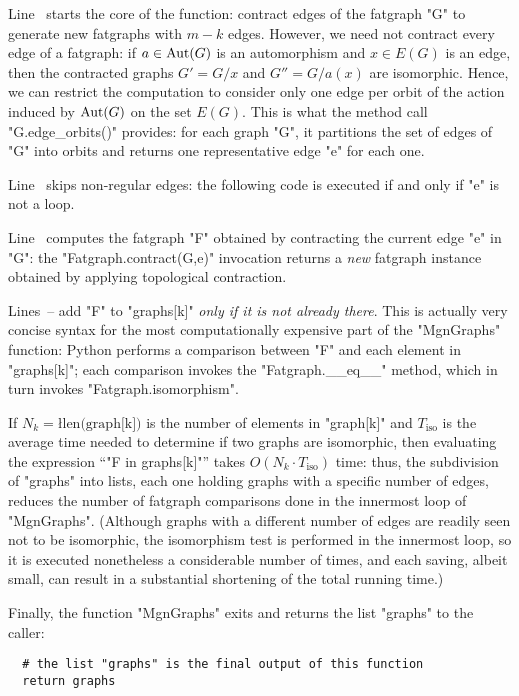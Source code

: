 Line~ starts the core of the function: contract edges
of the fatgraph "G" to generate new fatgraphs with $m-k$ edges.
However, we need not contract every edge of a fatgraph: if $a \in
\operatorname{Aut}(G)$ is an automorphism and $x \in E(G)$ is an edge, then the
contracted graphs $G' = G/x$ and $G'' = G/a(x)$ are isomorphic.
Hence, we can restrict the computation to consider only one edge per
orbit of the action induced by $\operatorname{Aut}(G)$ on the set $E(G)$. This is
what the method call "G.edge_orbits()" provides: for each graph "G",
it partitions the set of edges of "G" into orbits and returns one
representative edge "e" for each one.

Line~ skips non-regular edges: the following code is
executed if and only if "e" is not a loop.

Line~ computes the fatgraph "F" obtained by
contracting the current edge "e" in "G": the "Fatgraph.contract(G,e)"
invocation returns a \emph{new} fatgraph instance obtained by applying
topological contraction.

Lines~-- add "F" to "graphs[k]"
\emph{only if it is not already there}.  This is actually very concise
syntax for the most computationally expensive part of the "MgnGraphs"
function: Python performs a comparison between "F" and each element in
"graphs[k]"; each comparison invokes the "Fatgraph.__eq__" method,
which in turn invokes "Fatgraph.isomorphism".

If $N_k = \text{\l{len(graph[k])}}$ is the number of elements in
"graph[k]" and $T_\text{iso}$ is the average time needed to
determine if two graphs are isomorphic, then evaluating the expression
``"F in graphs[k]"'' takes $O(N_k \cdot T_\text{iso})$ time: thus, the
subdivision of "graphs" into lists, each one holding graphs with a
specific number of edges, reduces the number of fatgraph comparisons
done in the innermost loop of "MgnGraphs".  (Although graphs with a
different number of edges are readily seen not to be isomorphic, the
isomorphism test is performed in the innermost loop, so it is executed
nonetheless a considerable number of times, and each saving, albeit
small, can result in a substantial shortening of the total running
time.)

Finally, the function "MgnGraphs" exits and returns the list "graphs"
to the caller:
\begin{lstlisting}
  # the list "graphs" is the final output of this function
  return graphs
\end{lstlisting}

